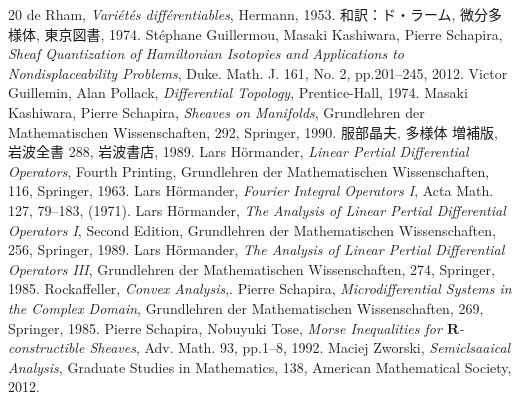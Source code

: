 \documentclass[leqno, 10pt, a4paper, dvipdfmx]{jsarticle}
\theoremstyle{definition}
\newcommand{\rr}{\mathbf{R}}
\numberwithin{equation}{section}
\theoremstyle{mystyle}
\begin{document}
\begin{thebibliography}{20} 
  de Rham, \textit{Vari\'et\'es diff\'erentiables}, Hermann, 1953.
  和訳：ド・ラーム, 微分多様体, 東京図書, 1974.
   St\'ephane Guillermou, 
  Masaki Kashiwara, Pierre Schapira, 
  \textit{Sheaf Quantization of Hamiltonian Isotopies and Applications to Nondisplaceability Problems}, 
  Duke. Math. J. 161, No. 2, pp.201--245, 2012.  
   Victor Guillemin, Alan Pollack, 
    \textit{Differential Topology}, 
    Prentice-Hall, 1974.
   Masaki Kashiwara, Pierre Schapira, 
    \textit{Sheaves on Manifolds}, 
    Grundlehren der Mathematischen Wissenschaften, 292, Springer, 1990.
   服部晶夫, 多様体 増補版, 岩波全書 288, 岩波書店, 1989.
   Lars H\"ormander, 
  \textit{Linear Pertial Differential Operators}, Fourth Printing, 
  Grundlehren der Mathematischen Wissenschaften, 116, Springer, 1963.
   Lars H\"ormander, 
  \textit{Fourier Integral Operators I}, 
  Acta Math. 127, 79--183, (1971).
   Lars H\"ormander, 
  \textit{The Analysis of Linear Pertial Differential Operators I}, Second Edition,
  Grundlehren der Mathematischen Wissenschaften, 256, Springer, 1989.
   Lars H\"ormander, 
  \textit{The Analysis of Linear Pertial Differential Operators III}, 
  Grundlehren der Mathematischen Wissenschaften, 274, Springer, 1985.
   Rockaffeller, \textit{Convex Analysis},. 
   Pierre Schapira, 
    \textit{Microdifferential Systems in the Complex Domain}, 
    Grundlehren der Mathematischen Wissenschaften, 269, 
    Springer, 1985.
     Pierre Schapira, Nobuyuki Tose, 
    \textit{Morse Inequalities for \(\rr\)-constructible Sheaves}, 
    Adv. Math. 93, pp.1--8, 1992. 
     Maciej Zworski,
    \textit{Semiclsaaical Analysis}, 
    Graduate Studies in Mathematics, 138, 
    American Mathematical Society, 
    2012. 
\end{thebibliography}

\end{document}
